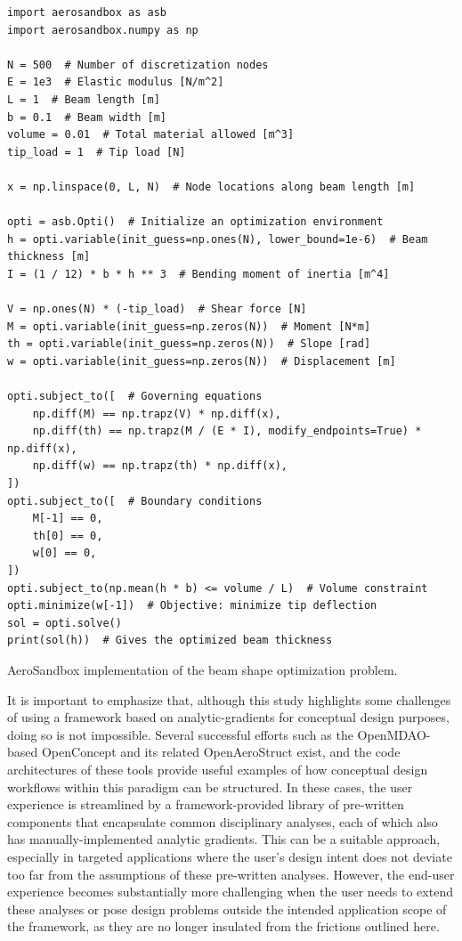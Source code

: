 \begin{listing}[h]
    \begin{verbatim}
import aerosandbox as asb
import aerosandbox.numpy as np

N = 500  # Number of discretization nodes
E = 1e3  # Elastic modulus [N/m^2]
L = 1  # Beam length [m]
b = 0.1  # Beam width [m]
volume = 0.01  # Total material allowed [m^3]
tip_load = 1  # Tip load [N]

x = np.linspace(0, L, N)  # Node locations along beam length [m]

opti = asb.Opti()  # Initialize an optimization environment
h = opti.variable(init_guess=np.ones(N), lower_bound=1e-6)  # Beam thickness [m]
I = (1 / 12) * b * h ** 3  # Bending moment of inertia [m^4]

V = np.ones(N) * (-tip_load)  # Shear force [N]
M = opti.variable(init_guess=np.zeros(N))  # Moment [N*m]
th = opti.variable(init_guess=np.zeros(N))  # Slope [rad]
w = opti.variable(init_guess=np.zeros(N))  # Displacement [m]

opti.subject_to([  # Governing equations
    np.diff(M) == np.trapz(V) * np.diff(x),
    np.diff(th) == np.trapz(M / (E * I), modify_endpoints=True) * np.diff(x),
    np.diff(w) == np.trapz(th) * np.diff(x),
])
opti.subject_to([  # Boundary conditions
    M[-1] == 0,
    th[0] == 0,
    w[0] == 0,
])
opti.subject_to(np.mean(h * b) <= volume / L)  # Volume constraint
opti.minimize(w[-1])  # Objective: minimize tip deflection
sol = opti.solve()
print(sol(h))  # Gives the optimized beam thickness
    \end{verbatim}
    \caption{AeroSandbox implementation of the beam shape optimization problem.}
    \label{lst:om_beam}
\end{listing}

It is important to emphasize that, although this study highlights some challenges of using a framework based on analytic-gradients for conceptual design purposes, doing so is not impossible. Several successful efforts such as the OpenMDAO-based OpenConcept \cite{Brelje2018a} and its related OpenAeroStruct \cite{Adler2022d} exist, and the code architectures of these tools provide useful examples of how conceptual design workflows within this paradigm can be structured. In these cases, the user experience is streamlined by a framework-provided library of pre-written components that encapsulate common disciplinary analyses, each of which also has manually-implemented analytic gradients. This can be a suitable approach, especially in targeted applications where the user's design intent does not deviate too far from the assumptions of these pre-written analyses. However, the end-user experience becomes substantially more challenging when the user needs to extend these analyses or pose design problems outside the intended application scope of the framework, as they are no longer insulated from the frictions outlined here.

